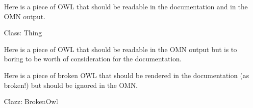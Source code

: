 \documentclass[pdf]{article}
\begin{document}
Here is a piece of OWL that should be readable in the documentation and in the
OMN output. 

\begin{owl}
Class: Thing
\end{owl}


Here is a piece of OWL that should be readable in the OMN output but is to
boring to be worth of consideration for the documentation. 



Here is a piece of broken OWL that should be rendered in the documentation (as
broken!) but should be ignored in the OMN. 

\begin{notowl}
Clazz: BrokenOwl
\end{notowl}

\end{document}
